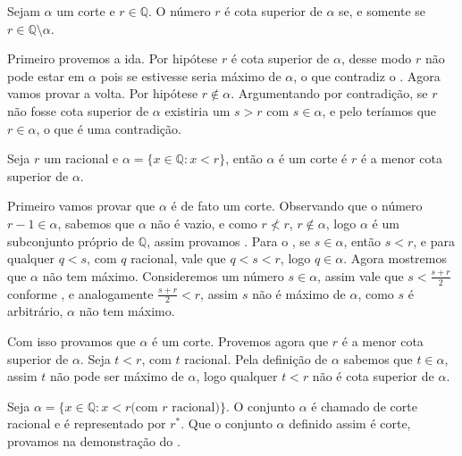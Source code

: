 \documentclass[../main.tex]{subfiles}
\begin{document}
\begin{prop}
    Sejam $\alpha$ um corte e $r \in \mathbb{Q}$. O número $r$ é cota superior de $\alpha$ se, e somente se $r \in \mathbb{Q} \setminus \alpha$. 
\end{prop}
\begin{dem}
    Primeiro provemos a ida. Por hipótese $r$ é cota superior de $\alpha$, desse modo $r$ não pode estar em $\alpha$ pois se estivesse seria máximo de $\alpha$, o que contradiz o .
    Agora vamos provar a volta. Por hipótese $r \not\in \alpha$. Argumentando por contradição, se $r$ não fosse cota superior de $\alpha$ existiria um $s > r$ com $s \in \alpha$, e pelo  teríamos que $r \in \alpha$, o que é uma contradição.
\end{dem}
\begin{teo}\label{reais-teo-corteRacional}
    Seja $r$ um racional e $\alpha = \{ x \in \mathbb{Q} : x < r \}$, então $\alpha$ é um corte é $r$ é a menor cota superior de $\alpha$.
\end{teo}
\begin{dem}
    
    Primeiro vamos provar que $\alpha$ é de fato um corte. Observando que o número $r - 1 \in \alpha$, sabemos que $\alpha$ não é vazio, e como $r \not< r$, $r \not\in \alpha$, logo $\alpha$ é um subconjunto próprio de $\mathbb{Q}$, assim provamos .
    Para o , se $s \in \alpha$, então $s < r$, e para qualquer $q < s$, com $q$ racional, vale que $q < s < r$, logo $q \in \alpha$.
    Agora mostremos que $\alpha$ não tem máximo. Consideremos um número $s \in \alpha$, assim vale que $s < \frac{s+r}{2}$ conforme , e analogamente $\frac{s+r}{2} < r$, assim $s$ não é máximo de $\alpha$, como $s$ é arbitrário, $\alpha$ não tem máximo.

    Com isso provamos que $\alpha$ é um corte. Provemos agora que $r$ é a menor cota superior de $\alpha$. Seja $t < r$, com $t$ racional. Pela definição de $\alpha$ sabemos que $t \in \alpha$, assim $t$ não pode ser máximo de $\alpha$, logo qualquer $t < r$ não é cota superior de $\alpha$.
\end{dem}

\begin{defi}
    Seja $\alpha = \{ x \in \mathbb{Q} : x < r \text{(com $r$ racional)} \}$. O conjunto $\alpha$ é chamado de corte racional e é representado por $r^*$. Que o conjunto $\alpha$ definido assim é corte, provamos na demonstração do .
\end{defi}
\end{document}
